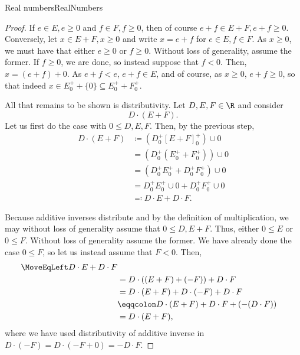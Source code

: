 \begin{thm}{Real numbers}{RealNumbers}
\begin{proof}
If $e\in E,e\geq 0$ and $f\in F,f\geq 0$, then of course $e+f\in E+F,e+f\geq 0$.  Conversely, let $x\in E+F,x\geq 0$ and write $x=e+f$ for $e\in E,f\in F$.  As $x\geq 0$, we must have that either $e\geq 0$ or $f\geq 0$.  Without loss of generality, assume the former.  If $f\geq 0$, we are done, so instead suppose that $f<0$.  Then, $x=(e+f)+0$.  As $e+f<e$, $e+f\in E$, and of course, as $x\geq 0$, $e+f\geq 0$, so that indeed $x\in E_0^++\{ 0\} \subseteq E_0^++F_0^+$.

All that remains to be shown is distributivity.  Let $D,E,F\in \R$ and consider
\begin{equation}
D\cdot (E+F).
\end{equation}
Let us first do the case with $0\leq D,E,F$.  Then, by the previous step,
\begin{equation}
\begin{split}
D\cdot (E+F) & \coloneqq \left( D_0^+[E+F]_0^+\right) \cup 0 \\
& =\left( D_0^+(E_0^++F_0^+)\right) \cup 0 \\
& =\left( D_0^+E_0^++D_0^+F_0^+\right) \cup 0 \\
& =D_0^+E_0^+\cup 0+D_0^+F_0^+\cup 0 \\
& \eqqcolon D\cdot E+D\cdot F.
\end{split}
\end{equation}

Because additive inverses distribute and by the definition of multiplication, we may without loss of generality assume that $0\leq D,E+F$.  Thus, either $0\leq E$ or $0\leq F$.  Without loss of generality assume the former.  We have already done the case $0\leq F$, so let us instead assume that $F<0$.  Then,
\begin{equation}
\begin{split}
\MoveEqLeft
D\cdot E+D\cdot F \\
& =D\cdot \left( (E+F)+(-F)\right) +D\cdot F \\
& =D\cdot (E+F)+D\cdot (-F)+D\cdot F \\
& \eqqcolon D\cdot (E+F)+D\cdot F+\left( -(D\cdot F)\right) \\
& =D\cdot (E+F),
\end{split}
\end{equation}
where we have used distributivity of additive inverse in $D\cdot (-F)=D\cdot (-F+0)=-D\cdot F$.


\end{proof}
\end{thm}
